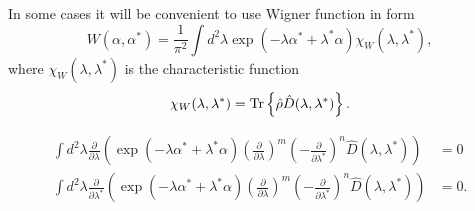In some cases it will be convenient to use Wigner function in form~\cite{Gardiner2004}
\begin{equation}
\label{eqn:formalism:sm-wigner:w-function}
	W (\alpha, \alpha^*)
	= \frac{1}{\pi^2} \int d^2 \lambda \exp(-\lambda \alpha^* + \lambda^* \alpha)
		\chi_W (\lambda, \lambda^*),
\end{equation}
where $\chi_W (\lambda, \lambda^*)$ is the characteristic function
\[
	\chi_W (\lambda, \lambda^*)
	= \mathrm{Tr} \left\{  \hat{\rho} \hat{D}(\lambda, \lambda^*)  \right\}.
\]

\begin{lemma}
\label{lmm:formalism:sm-wigner:zero-integrals}
\begin{equation*}
\begin{split}
	\int d^2\lambda
		\frac{\partial}{\partial \lambda} \left(
			\exp(-\lambda \alpha^* + \lambda^* \alpha)
			\left( \frac{\partial}{\partial \lambda} \right)^m
			\left( -\frac{\partial}{\partial \lambda^*} \right)^n
			\hat{D}(\lambda, \lambda^*)
		\right)
	& = 0 \\
	\int d^2\lambda
		\frac{\partial}{\partial \lambda^*}
		\left(
			\exp(-\lambda \alpha^* + \lambda^* \alpha)
			\left( \frac{\partial}{\partial \lambda} \right)^m
			\left( -\frac{\partial}{\partial \lambda^*} \right)^n
			\hat{D}(\lambda, \lambda^*)
		\right)
	& = 0.
\end{split}
\end{equation*}
\end{lemma}
